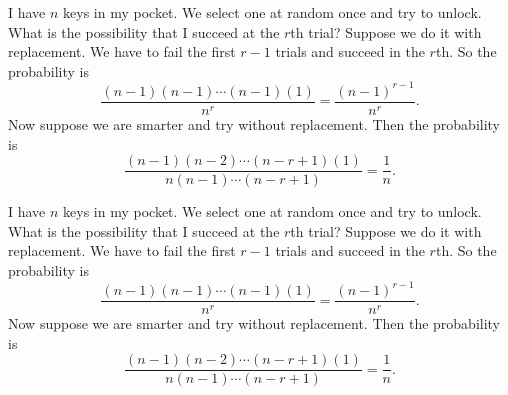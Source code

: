 \begin{note}
  \begin{field}
    \begin{eg}
      I have $n$ keys in my pocket. We select one at random once and try to unlock. What is the possibility that I succeed at the $r$th trial?
      Suppose we do it with replacement. We have to fail the first $r - 1$ trials and succeed in the $r$th. So the probability is
      \[
        \frac{(n - 1)(n - 1) \cdots (n - 1)(1)}{n^r} = \frac{(n - 1)^{r - 1}}{n^r}.
      \]
      Now suppose we are smarter and try without replacement. Then the probability is
      \[
        \frac{(n - 1)(n - 2)\cdots (n - r + 1)(1)}{n(n - 1) \cdots (n - r + 1)} = \frac{1}{n}.
      \]
    \end{eg}
  \end{field}
  \begin{field}
    \begin{eg}
      I have $n$ keys in my pocket. We select one at random once and try to unlock. What is the possibility that I succeed at the $r$th trial?
      Suppose we do it with replacement. We have to fail the first $r - 1$ trials and succeed in the $r$th. So the probability is
      \[
        \frac{(n - 1)(n - 1) \cdots (n - 1)(1)}{n^r} = \frac{(n - 1)^{r - 1}}{n^r}.
      \]
      Now suppose we are smarter and try without replacement. Then the probability is
      \[
        \frac{(n - 1)(n - 2)\cdots (n - r + 1)(1)}{n(n - 1) \cdots (n - r + 1)} = \frac{1}{n}.
      \]
    \end{eg}
  \end{field}
  \xplain{}%
\end{note}

